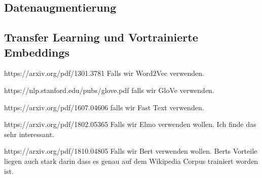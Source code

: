 \subsection{Datenaugmentierung}

\subsection{Transfer Learning und Vortrainierte Embeddings}

https://arxiv.org/pdf/1301.3781 Falls wir Word2Vec verwenden.

https://nlp.stanford.edu/pubs/glove.pdf falls wir GloVe verwenden.


https://arxiv.org/pdf/1607.04606 falls wir Fast Text verwenden.

https://arxiv.org/pdf/1802.05365 Falls wir Elmo verwenden wollen. Ich finde das sehr interessant.


https://arxiv.org/pdf/1810.04805 Falls wir Bert verwenden wollen. Berts Vorteile liegen auch stark darin dass es genau auf dem Wikipedia Corpus trainiert worden ist.

